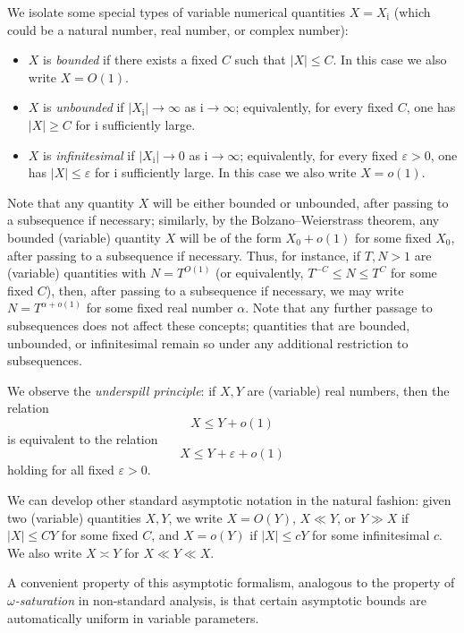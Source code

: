 \documentclass[a4paper, 10pt]{amsart}
\newcommand{\eps}{\varepsilon}
\newcommand{\ii}{{\mathrm{i}}}
\begin{document}
We isolate some special types of variable numerical quantities $X = X_{\ii}$ (which could be a natural number, real number, or complex number):
\begin{itemize}
\item $X$ is \emph{bounded} if there exists a fixed $C$ such that $|X| \leq C$. In this case we also write $X = O(1)$.
\item $X$ is \emph{unbounded} if $|X_{\ii}| \to \infty$ as $\ii \to \infty$; equivalently, for every fixed $C$, one has $|X| \geq C$ for $\ii$ sufficiently large.
\item $X$ is \emph{infinitesimal} if $|X_{\ii}| \to 0$ as $\ii \to \infty$; equivalently, for every fixed $\eps>0$, one has $|X| \leq \eps$ for $\ii$ sufficiently large. In this case we also write $X = o(1)$.
\end{itemize}

Note that any quantity $X$ will be either bounded or unbounded, after passing to a subsequence if necessary; similarly, by the Bolzano--Weierstrass theorem, any bounded (variable) quantity $X$ will be of the form $X_0+o(1)$ for some fixed $X_0$, after passing to a subsequence if necessary.  Thus, for instance, if $T, N > 1$ are (variable) quantities with $N = T^{O(1)}$ (or equivalently, $T^{-C} \leq N \leq T^C$ for some fixed $C$), then, after passing to a subsequence if necessary, we may write $N = T^{\alpha+o(1)}$ for some fixed real number $\alpha$.  Note that any further passage to subsequences does not affect these concepts; quantities that are bounded, unbounded, or infinitesimal remain so under any additional restriction to subsequences.

We observe the \emph{underspill principle}: if $X,Y$ are (variable) real numbers, then the relation
$$ X \leq Y + o(1)$$
is equivalent to the relation
$$ X \leq Y + \eps + o(1)$$
holding for all fixed $\eps>0$.

We can develop other standard asymptotic notation in the natural fashion: given two (variable) quantities $X,Y$, we write $X = O(Y)$, $X \ll Y$, or $Y \gg X$ if $|X| \leq CY$ for some fixed $C$, and $X = o(Y)$ if $|X| \leq cY$ for some infinitesimal $c$.  We also write $X \asymp Y$ for $X \ll Y \ll X$.

A convenient property of this asymptotic formalism, analogous to the property of \emph{$\omega$-saturation} in non-standard analysis, is that certain asymptotic bounds are automatically uniform in variable parameters.
\end{document}
